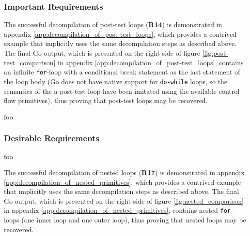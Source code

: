
\subsubsection{Important Requirements}
\label{sec:eval_control_flow_analysis_library_important_requirements}


The successful decompilation of post-test loops (\textbf{R14}) is demonstrated in appendix \ref{app:decompilation_of_post-test_loops}, which provides a contrived example that implicitly uses the same decompilation steps as described above. The final Go output, which is presented on the right side of figure \ref{fig:post-test_comparison} in appendix \ref{app:decompilation_of_post-test_loops}, contains an infinite \texttt{for}-loop with a conditional break statement as the last statement of the loop body (Go does not have native support for \texttt{do-while} loops, so the semantics of the a post-test loop have been imitated using the available control flow primitives), thus proving that post-test loops may be recovered.


foo


\subsubsection{Desirable Requirements}
\label{sec:eval_control_flow_analysis_library_desirable_requirements}


foo


The successful decompilation of nested loops (\textbf{R17}) is demonstrated in appendix \ref{app:decompilation_of_nested_primitives}, which provides a contrived example that implicitly uses the same decompilation steps as described above. The final Go output, which is presented on the right side of figure \ref{fig:nested_comparison} in appendix \ref{app:decompilation_of_nested_primitives}, contains nested \texttt{for}-loops (one inner loop and one outer loop), thus proving that nested loops may be recovered.
